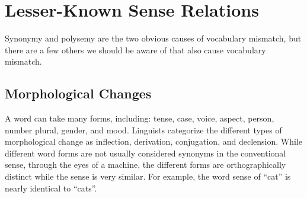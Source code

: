 











\section{Lesser-Known Sense Relations}

Synonymy and polysemy are the two obvious causes of vocabulary mismatch, but there are a few others we should be aware of that also cause vocabulary mismatch.

\subsection{Morphological Changes}
A word can take many forms, including: tense, case, voice, aspect, person, number plural, gender, and mood. Linguists categorize the different types of morphological change as inflection, derivation, conjugation, and declension. While different word forms are not usually considered synonyms in the conventional sense, through the eyes of a machine, the different forms are orthographically distinct while the sense is very similar. For example, the word sense of ``cat'' is nearly identical to ``cats''.


